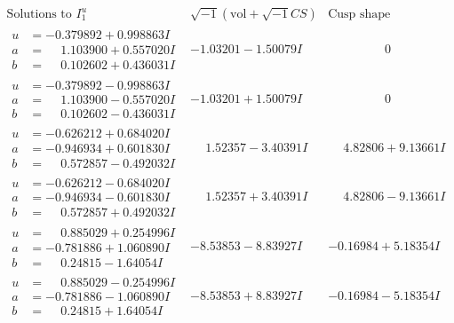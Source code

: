 \documentclass[1p]{elsarticle_modified}
\theoremstyle{definition}
\newcommand{\I}{\sqrt{-1}}
\begin{document}
$$\begin{array}{c|c|c}  
\text{Solutions to }I^u_{1}& \I (\text{vol} + \sqrt{-1}CS) & \text{Cusp shape}\\
 \hline 
\begin{aligned}
u &= -0.379892 + 0.998863 I \\
a &= \phantom{-}1.103900 + 0.557020 I \\
b &= \phantom{-}0.102602 + 0.436031 I\end{aligned}
 & -1.03201 - 1.50079 I & \phantom{-0.000000 } 0 \\ \hline\begin{aligned}
u &= -0.379892 - 0.998863 I \\
a &= \phantom{-}1.103900 - 0.557020 I \\
b &= \phantom{-}0.102602 - 0.436031 I\end{aligned}
 & -1.03201 + 1.50079 I & \phantom{-0.000000 } 0 \\ \hline\begin{aligned}
u &= -0.626212 + 0.684020 I \\
a &= -0.946934 + 0.601830 I \\
b &= \phantom{-}0.572857 - 0.492032 I\end{aligned}
 & \phantom{-}1.52357 - 3.40391 I & \phantom{-}4.82806 + 9.13661 I \\ \hline\begin{aligned}
u &= -0.626212 - 0.684020 I \\
a &= -0.946934 - 0.601830 I \\
b &= \phantom{-}0.572857 + 0.492032 I\end{aligned}
 & \phantom{-}1.52357 + 3.40391 I & \phantom{-}4.82806 - 9.13661 I \\ \hline\begin{aligned}
u &= \phantom{-}0.885029 + 0.254996 I \\
a &= -0.781886 + 1.060890 I \\
b &= \phantom{-}0.24815 - 1.64054 I\end{aligned}
 & -8.53853 - 8.83927 I & -0.16984 + 5.18354 I \\ \hline\begin{aligned}
u &= \phantom{-}0.885029 - 0.254996 I \\
a &= -0.781886 - 1.060890 I \\
b &= \phantom{-}0.24815 + 1.64054 I\end{aligned}
 & -8.53853 + 8.83927 I & -0.16984 - 5.18354 I \\ \hline\begin{aligned}

\end{aligned}
\end{array}$$
\end{document}
